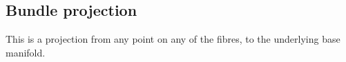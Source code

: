 
\subsection{Bundle projection}

This is a projection from any point on any of the fibres, to the underlying base manifold.

